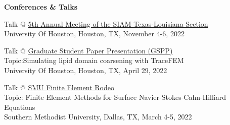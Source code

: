 \documentclass[10pt,letterpaper]{letter}
\begin{document}
\textbf{Conferences \& Talks}
\begin{etaremune}
	\item Talk @ \href{https://www.math.uh.edu/siamtxla22/index.shtml}{5th Annual Meeting of the SIAM Texas-Louisiana Section} \\
	University Of Houston, Houston, TX, November 4-6, 2022
	\item Talk @ \href{https://uh.edu/nsm/math/news-events/stories/2022-math/gspp_2022/}{Graduate Student Paper Presentation (GSPP)} \\
	 Topic:Simulating lipid domain coarsening with TraceFEM\\
	 University Of Houston, Houston, TX, April 29, 2022
	\item Talk @ \href{https://people.smu.edu/sxu/2022-smu-fe-rodeo/}{SMU Finite Element Rodeo} \\ Topic: Finite Element Methods for Surface Navier-Stokes-Cahn-Hilliard Equations \\Southern Methodist University, Dallas, TX, March 4-5, 2022
\end{etaremune}
\end{document}
